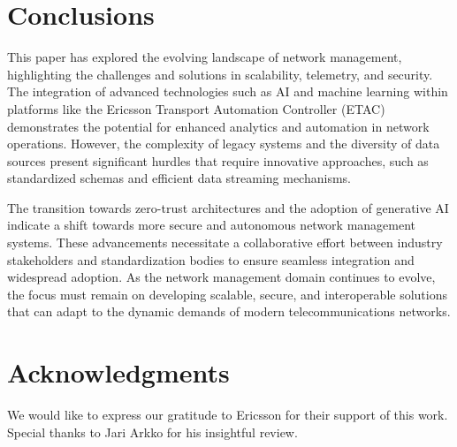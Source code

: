 \documentclass[10pt,sigconf]{iabart}
\begin{document}
\section{Conclusions} \label{conclusions}


This paper has explored the evolving landscape of network management, highlighting the challenges and solutions in scalability, telemetry, and security. The integration of advanced technologies such as AI and machine learning within platforms like the Ericsson Transport Automation Controller (ETAC) demonstrates the potential for enhanced analytics and automation in network operations. However, the complexity of legacy systems and the diversity of data sources present significant hurdles that require innovative approaches, such as standardized schemas and efficient data streaming mechanisms.

The transition towards zero-trust architectures and the adoption of generative AI indicate a shift towards more secure and autonomous network management systems. These advancements necessitate a collaborative effort between industry stakeholders and standardization bodies to ensure seamless integration and widespread adoption. As the network management domain continues to evolve, the focus must remain on developing scalable, secure, and interoperable solutions that can adapt to the dynamic demands of modern telecommunications networks.

\section{Acknowledgments}

We would like to express our gratitude to Ericsson for their support of this work. Special thanks to Jari Arkko for his insightful review.



\end{document}
